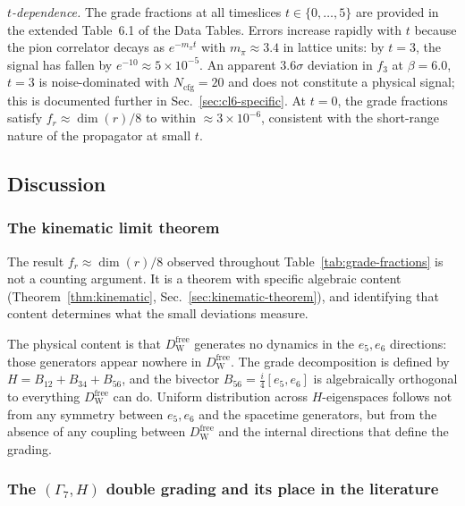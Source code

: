 \documentclass[12pt]{article}
\theoremstyle{definition}
\theoremstyle{remark}
\newcommand{\dW}{D_{\mathrm{W}}}        %
\newcommand{\GaSeven}{\Gamma_7}                      %
\newcommand{\Ncfg}{N_{\mathrm{cfg}}}                  %
\begin{document}
	\medskip
	\noindent\textit{$t$-dependence.}\enspace
	The grade fractions at all timeslices $t\in\{0,\ldots,5\}$ are provided in
	the extended Table~6.1 of the Data Tables.  Errors increase rapidly with $t$
	because the pion correlator decays as $e^{-m_\pi t}$ with $m_\pi\approx3.4$
	in lattice units: by $t=3$, the signal has fallen by $e^{-10}\approx
	5\times10^{-5}$.  An apparent $3.6\sigma$ deviation in $f_3$ at
	$\beta=6.0$, $t=3$ is noise-dominated with $\Ncfg=20$ and does not
	constitute a physical signal; this is documented further in
	Sec.~\ref{sec:cl6-specific}.  At $t=0$, the grade fractions satisfy
	$f_r\approx\dim(r)/8$ to within $\approx3\times10^{-6}$, consistent with
	the short-range nature of the propagator at small $t$.
	
	\subsection{Discussion}
	\label{sec:discussion}
	
	\subsubsection{The kinematic limit theorem}
	\label{sec:kinematic-discussion}
	
	The result $f_r\approx\dim(r)/8$ observed throughout Table~\ref{tab:grade-fractions}
	is not a counting argument.  It is a theorem with specific algebraic content
	(Theorem~\ref{thm:kinematic}, Sec.~\ref{sec:kinematic-theorem}), and
	identifying that content determines what the small deviations measure.
	
	The physical content is that $\dW^{\mathrm{free}}$ generates no dynamics in
	the $e_5, e_6$ directions: those generators appear nowhere in $\dW^{\mathrm{free}}$.
	The grade decomposition is defined by $H = B_{12}+B_{34}+B_{56}$, and the
	bivector $B_{56} = \tfrac{i}{4}[e_5,e_6]$ is algebraically orthogonal to
	everything $\dW^{\mathrm{free}}$ can do.  Uniform distribution across
	$H$-eigenspaces follows not from any symmetry between $e_5, e_6$ and the
	spacetime generators, but from the absence of any coupling between
	$\dW^{\mathrm{free}}$ and the internal directions that define the grading.
	
	\subsubsection{The \texorpdfstring{$(\GaSeven, H)$}{(Gamma7, H)} double
		grading and its place in the literature}
	\label{sec:grading-literature}
	
\end{document}
